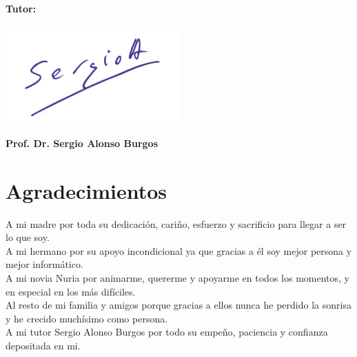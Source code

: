 \vspace{1cm}

\textbf{Tutor:}

\vspace{1cm}

\includegraphics[width=0.5\textwidth]{./imagenes/firmaZerjillo3}

\noindent \textbf{Prof. Dr. Sergio Alonso Burgos }

\chapter*{Agradecimientos}
\thispagestyle{empty}

       \vspace{1cm}

A mi madre por toda su dedicación, cariño, esfuerzo y sacrificio para llegar a ser lo que soy.\\

A mi hermano por su apoyo incondicional ya que gracias a él soy mejor persona y mejor informático.\\

A mi novia Nuria por animarme, quererme y apoyarme en todos los momentos, y en especial en los más difíciles.\\

Al resto de mi familia y amigos porque gracias a ellos nunca he perdido la sonrisa y he crecido muchísimo como persona.\\

A mi tutor Sergio Alonso Burgos por todo su empeño, paciencia y confianza depositada en mi.
